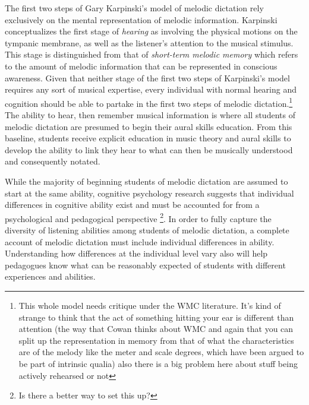 \documentclass[]{book}
\let\rmarkdownfootnote\footnote%
\def\footnote{\protect\rmarkdownfootnote}
\begin{document}
The first two steps of Gary Karpinski's model of melodic dictation \citep{karpinskiAuralSkillsAcquisition2000, karpinskiModelMusicPerception1990} rely exclusively on the mental representation of melodic information.
Karpinski conceptualizes the first stage of \emph{hearing} as involving the physical motions on the tympanic membrane, as well as the listener's attention to the musical stimulus.
This stage is distinguished from that of \emph{short-term melodic memory} which refers to the amount of melodic information that can be represented in conscious awareness.
Given that neither stage of the first two steps of Karpinski's model requires any sort of musical expertise, every individual with normal hearing and cognition should be able to partake in the first two steps of melodic dictation.\footnote{This whole model needs critique under the WMC literature. It's kind of strange to think that the act of something hitting your ear is different than attention (the way that Cowan thinks about WMC and again that you can split up the representation in memory from that of what the characteristics are of the melody like the meter and scale degrees, which have been argued to be part of intrinsic qualia) also there is a big problem here about stuff being actively rehearsed or not}
The ability to hear, then remember musical information is where all students of melodic dictation are presumed to begin their aural skills education.
From this baseline, students receive explicit education in music theory and aural skills to develop the ability to link they hear to what can then be musically understood and consequently notated.

While the majority of beginning students of melodic dictation are assumed to start at the same ability, cognitive psychology research suggests that individual differences in cognitive ability exist and must be accounted for from a psychological and pedagogical perspective \citep{cowanWorkingMemoryCapacity2005, ritchieIntelligenceAllThat2015}\footnote{Is there a better way to set this up?}.
In order to fully capture the diversity of listening abilities among students of melodic dictation, a complete account of melodic dictation must include individual differences in ability.
Understanding how differences at the individual level vary also will help pedagogues know what can be reasonably expected of students with different experiences and abilities.
\end{document}
